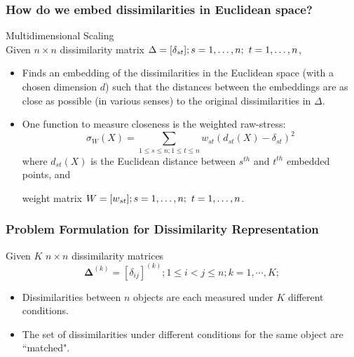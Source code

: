 \documentclass{beamer}
\begin{document}
\begin{frame}
\frametitle{How do we embed dissimilarities in Euclidean space?}
Multidimensional Scaling \cite{borg+groenen:1997}\\
  \vspace*{\fill}
Given $n \times n$ dissimilarity matrix $\Delta=[\delta_{st}]; s =1,\ldots,n;\hspace{3.5pt}t= 1,\ldots,n   $,
\begin{itemize}
\item<1-> Finds an embedding of the dissimilarities in the Euclidean space  (with a chosen dimension $d$) such that the distances between the embeddings are as close as possible (in various senses) to the original dissimilarities in $\Delta$. 
\item<2->  One  function to measure closeness is the weighted raw-stress: 
\begin{equation*}
\sigma_{W}(X)=\sum_{1\leq s\leq n;1\leq t\leq n} {w_{st}(d_{st}(X)-\delta_{st})^2  }\label{raw-stress}
\end{equation*}
where $d_{st}(X)$ is the Euclidean distance between $s^{th}$ and $t^{th}$ embedded points, and 

weight matrix $W={[w_{st}]; s =1,\ldots,n;\hspace{3.5pt}t= 1,\ldots,n}$.
\end{itemize}
\end{frame}
\begin{frame}
  \frametitle{Problem Formulation for Dissimilarity Representation}
  
  Given $K$ $n \times n$ dissimilarity matrices
  \[
   \bm{\Delta}^{(k)}= [\delta_{ij}]^{(k)} ;
  1\leq i  <  j \leq n; k=1,\cdots,K;
  \]
  \begin{itemize}
  \item<1-> Dissimilarities between $n$ objects are each measured under $K$ different conditions.
  \item<2-> The set of dissimilarities under different conditions for the same  object are ``matched".
  \end{itemize}



  
\end{frame}
\end{document}
